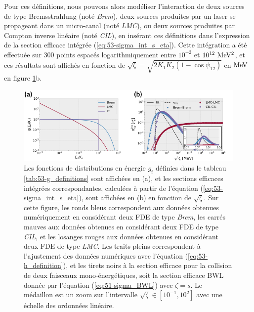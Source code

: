 \begin{refsection}
Pour ces définitions, nous pouvons alors modéliser l'interaction de deux sources de type Bremsstrahlung (noté \textit{Brem}), deux sources produites par un laser se propageant dans un micro-canal (noté \textit{LMC}), ou deux sources produites par Compton inverse linéaire (noté \textit{CIL}), en insérant ces définitions dans l'expression de la section efficace intégrée (\ref{eq:53-sigma_int_s_eta}). Cette intégration a été effectuée sur 300 points espacés logarithmiquement entre $10^{-2}$ et $10^{12} ~ \rm MeV^2$, et ces résultats sont affichés en fonction de $\sqrt{\zeta}=\sqrt{2 K_1 K_2 (1-\cos{\psi_{12}})}$ en $\rm MeV$ en figure \ref{fig:53-sigma_int_resultats}b.

\begin{figure}[hbtp]
	\centering
	\includegraphics[width=\linewidth]{5-opti_theorique/resultats.png}
	\caption{Les fonctions de distributions en énergie $g_i$ définies dans le tableau \ref{tab:53-g_definitions} sont affichées en (a), et les sections efficaces intégrées correspondantes, calculées à partir de l'équation (\ref{eq:53-sigma_int_s_eta}), sont affichées en (b) en fonction de $\sqrt{\zeta}$. Sur cette figure, les ronds bleus correspondent aux données obtenues numériquement en considérant deux FDE de type \textit{Brem}, les carrés mauves aux données obtenues en considérant deux FDE de type \textit{CIL}, et les losanges rouges aux données obtenues en considérant deux FDE de type \textit{LMC}. Les traits pleins correspondent à l'ajustement des données numériques avec l'équation (\ref{eq:53-h_definition}), et les tirets noirs à la section efficace pour la collision de deux faisceaux mono-énergétiques, soit la section efficace BWL donnée par l'équation (\ref{eq:51-sigma_BWL}) avec $\zeta=s$. Le médaillon est un zoom sur l'intervalle $\sqrt{\zeta}\in[10^{-1},10^2]$ avec une échelle des ordonnées linéaire.}
	\label{fig:53-sigma_int_resultats}
\end{figure}


\end{refsection}
